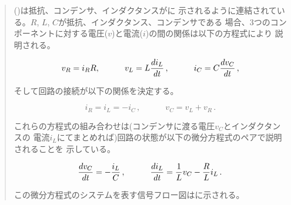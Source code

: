 \begin{quote}
()は抵抗、コンデンサ、インダクタンスがに
示されるように連結されている。\( R \), \( L \), \( C \)が抵抗、インダクタンス、コンデンサである
場合、3つのコンポーネントに対する電圧(\( v \))と電流(\( i \))の間の関係は以下の方程式により
説明される。
\begin{comment}

\begin{example}
v_R = i_R R

         d i_L
v_L = L -------
          d t

         d v_C
i_C = C -------
          d t
\end{example}

\end{comment}
\begin{displaymath}
 	v_R 	= 	i_R R, \qquad\quad
	v_L 	= 	L {di_L \over dt}\,, \qquad\quad
	i_C 	= 	C {dv_C \over dt}\,, 
\end{displaymath}

そして回路の接続が以下の関係を決定する。
\begin{comment}

\begin{example}
i_R = i_L = -i_C

v_C = v_L + v_R
\end{example}

\end{comment}
\begin{displaymath}
 	i_R 	= 	i_L = -i_C\,, \qquad\quad
	v_C 	= 	v_L +  v_R\,.  
\end{displaymath}


これらの方程式の組み合わせは(コンデンサに渡る電圧\( v_C \)とインダクタンスの
電流\( i_L \)にてまとめれば)回路の状態が以下の微分方程式のペアで説明されることを
示している。
\begin{comment}

\begin{example}
d v_C        i_L
-----  =  -  ---
 d t          C

d i_L      1           R
-----  =  --- v_C  -  --- i_L
 d t       L           L
\end{example}

\end{comment}
\begin{displaymath}
  {dv_C \over dt}  =  -{i_L \over C}\,, \qquad\quad
    {di_L \over dt}  =   {1   \over L} v_C - {R \over L} i_L\,. 
\end{displaymath}

この微分方程式のシステムを表す信号フロー図はに示される。
\end{quote}

